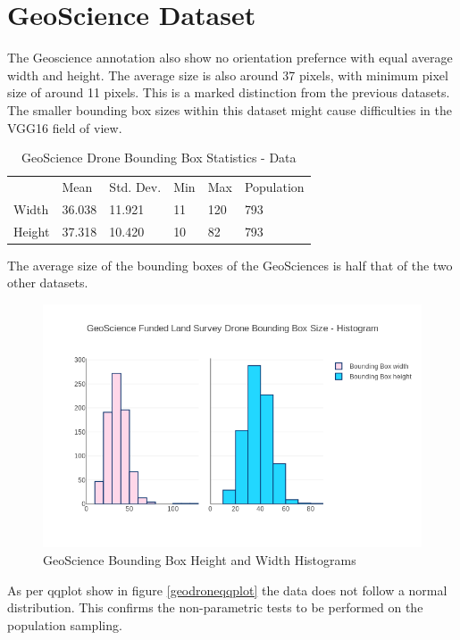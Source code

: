 \documentclass{article}
\begin{document}
\section{GeoScience Dataset}

The Geoscience annotation also show no orientation prefernce with equal average width and height. The average size is also around 37 pixels, with minimum pixel size of around 11 pixels. This is a marked distinction from the previous datasets. The smaller bounding box sizes within this dataset might cause difficulties in the VGG16 field of view.

\begin{table}[ht]
\caption{GeoScience Drone Bounding Box Statistics - Data}
\centering
\begin{tabular}{llllll}
       & Mean   & Std. Dev. & Min & Max & Population\\
Width  & 36.038 & 11.921 & 11 & 120 & 793 \\
Height & 37.318 & 10.420 & 10 & 82 & 793
\end{tabular}
\end{table}

The average size of the bounding boxes of the GeoSciences is half that of the two other datasets. 

\begin{figure}[ht]
\centering
\label{geodronethist}
\includegraphics[scale=0.4]{images/geoscience-histogram.png}
\caption{GeoScience Bounding Box Height and Width Histograms}
\end{figure}

As per qqplot show in figure \ref{geodroneqqplot} the data does not follow a normal distribution. This confirms the non-parametric tests to be performed on the population sampling.
\end{document}
